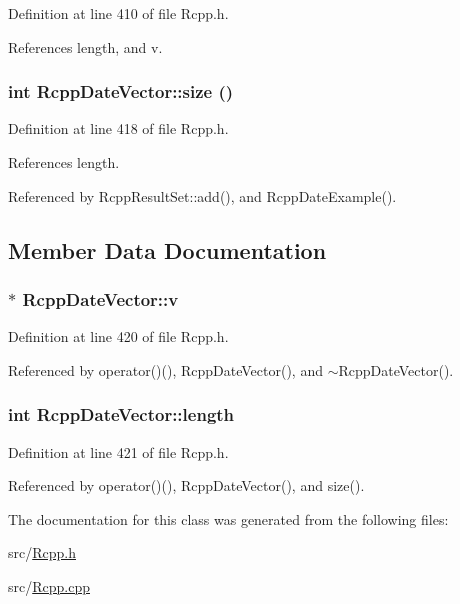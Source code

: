 Definition at line 410 of file Rcpp.h.

References length, and v.\hypertarget{classRcppDateVector_03db4282da968eb4e0ae2a38375e0d37}{
\subsubsection[size]{\setlength{\rightskip}{0pt plus 5cm}int RcppDateVector::size ()}}
\label{classRcppDateVector_03db4282da968eb4e0ae2a38375e0d37}




Definition at line 418 of file Rcpp.h.

References length.

Referenced by RcppResultSet::add(), and RcppDateExample().

\subsection{Member Data Documentation}
\hypertarget{classRcppDateVector_faa34ebaf3d8bac309e81895c376f545}{
\subsubsection[v]{$\ast$ {\bf RcppDateVector::v}}}
\label{classRcppDateVector_faa34ebaf3d8bac309e81895c376f545}




Definition at line 420 of file Rcpp.h.

Referenced by operator()(), RcppDateVector(), and $\sim$RcppDateVector().\hypertarget{classRcppDateVector_a36764f68111a84b737b78600ff06433}{
\subsubsection[length]{\setlength{\rightskip}{0pt plus 5cm}int {\bf RcppDateVector::length}}}
\label{classRcppDateVector_a36764f68111a84b737b78600ff06433}




Definition at line 421 of file Rcpp.h.

Referenced by operator()(), RcppDateVector(), and size().

The documentation for this class was generated from the following files:\begin{CompactItemize}
\item 
src/\hyperlink{Rcpp_8h}{Rcpp.h}\item 
src/\hyperlink{Rcpp_8cpp}{Rcpp.cpp}\end{CompactItemize}
